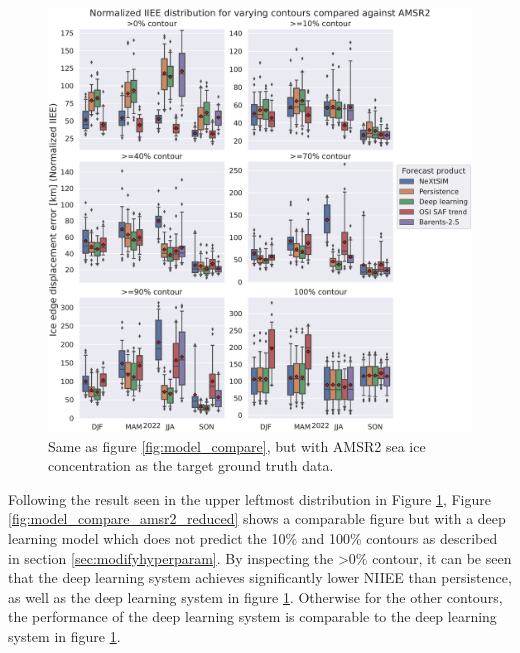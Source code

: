 \documentclass[../main/thesis.tex]{subfiles}
\begin{document}
\begin{figure}
    \centering
    \includegraphics[width=\textwidth]{model_intercomparisson_amsr2.pdf}
    \caption{\label{fig:model_compare_amsr2}Same as figure \ref{fig:model_compare}, but with AMSR2 sea ice concentration as the target ground truth data.}
\end{figure}

Following the result seen in the upper leftmost distribution in Figure \ref{fig:model_compare_amsr2}, Figure \ref{fig:model_compare_amsr2_reduced} shows a comparable figure but with a deep learning model which does not predict the 10\% and 100\% contours as described in section \ref{sec:modifyhyperparam}. By inspecting the >0\% contour, it can be seen that the deep learning system achieves significantly lower NIIEE than persistence, as well as the deep learning system in figure \ref{fig:model_compare_amsr2}. Otherwise for the other contours, the performance of the deep learning system is comparable to the deep learning system in figure \ref{fig:model_compare_amsr2}.
\end{document}
